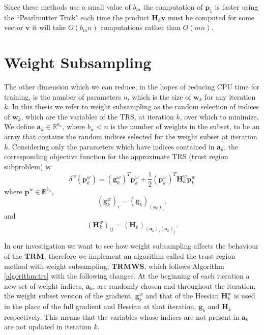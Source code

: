 \documentclass[letterpaper,12pt,titlepage,oneside,final]{book}
\begin{document}
	Since these methods use a small value of $b_{m}$ the computation of $\mathbf{p}_{1}$ is faster using the ``Pearlmutter Trick" each time the product $\mathbf{H}_{k}\mathbf{v}$ must be computed for some vector $\mathbf{v}$ it will take $O(b_{m}n)$ computations rather than $O(mn)$.
	
	\section{Weight Subsampling}

	The other dimension which we can reduce, in the hopes of reducing CPU time for training, is the number of parameters $n$, which is the size of $\mathbf{w}_{k}$ for any iteration $k$. In this thesis we refer to weight subsampling as the random selection of indices of $\mathbf{w}_{k}$, which are the variables of the TRS, at iteration $k$, over which to minimize. We define $\mathbf{a}_{k} \in \mathbb{R}^{b_{w}}$, where $b_{w} < n$ is the number of weights in the subset, to be an array that contains the random indices selected for the weight subset at iteration $k$. Considering only the parameters which have indices contained in $\mathbf{a}_{k}$, the corresponding objective function for the approximate TRS (trust region subproblem) is:
	\begin{equation}
	\delta^{w}(\mathbf{p}_{k}^{w}) = (\mathbf{g}_{k}^{w})^{T}\mathbf{p}_{k}^{w} + \frac{1}{2}(\mathbf{p}_{k}^{w})^{T}\mathbf{H}_{k}^{w}\mathbf{p}_{k}^{w}
	\label{equation:w_subset}
	\end{equation}
	where $\mathbf{p}^{w} \in \mathbb{R}^{b_{w}}$, 
	\begin{equation}
	(\mathbf{g}^{w}_{k})_{i} = (\mathbf{g}_{k})_{(\mathbf{a}_{k})_{i}},
	\end{equation}
	and
	\begin{equation}
	(\mathbf{H}^{w}_{k})_{ij} = (\mathbf{H}_{k})_{(\mathbf{a}_{k})_{i}(\mathbf{a}_{k})_{j}}.
	\end{equation}
	
	In our investigation we want to see how weight subsampling affects the behaviour of the $\mathbf{TRM}$, therefore we implement an algorithm called the trust region method with weight subsampling, \textbf{TRMWS}, which follows Algorithm \ref{algorithm:trs} with the following changes. At the beginning of each iteration a new set of weight indices, $\mathbf{a}_{k}$, are randomly chosen and throughout the iteration, the weight subset version of the gradient, $\mathbf{g}_{k}^{w}$ and that of the Hessian $\mathbf{H}_{k}^{w}$ is used in the place of the full gradient and Hessian at that iteration, $\mathbf{g}_{k}$ and $\mathbf{H}_{k}$ respectively. This means that the variables whose indices are not present in $\mathbf{a}_{k}$ are not updated in iteration $k$.
	
\end{document}
